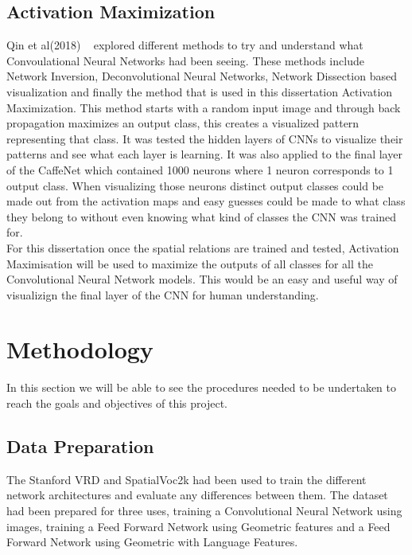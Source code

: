 \documentclass{csfyp}
\begin{document}
\subsection{Activation Maximization}
 Qin et al(2018) ~\cite{AM} explored different methods to try and understand what Convoulational Neural Networks had been seeing. These methods include Network Inversion, Deconvolutional Neural Networks, Network Dissection based visualization and finally the method that is used in this dissertation Activation Maximization. This method starts with a random input image and through back propagation maximizes an output class, this creates a visualized pattern representing that class. It was tested the hidden layers of CNNs to visualize their patterns and see what each layer is learning. It was also applied to the final layer of the CaffeNet which contained 1000 neurons where 1 neuron corresponds to 1 output class. When visualizing those neurons distinct output classes could be made out from the activation maps and easy guesses could be made to what class they belong to without even knowing what kind of classes the CNN was trained for.
\\ 
For this dissertation once the spatial relations are trained and tested, Activation Maximisation will be used to maximize the outputs of all classes for all the Convolutional Neural Network models. This would be an easy and useful way of visualizign the final layer of the CNN for human understanding.


\section{Methodology}
In this section we will be able to see the procedures needed to be undertaken to reach the goals and objectives of this project.

\subsection{Data Preparation}
The Stanford VRD and SpatialVoc2k had been used to train the different network architectures and evaluate any differences between them. The dataset had been prepared for three uses, training a Convolutional Neural Network using images, training a Feed Forward Network using Geometric features and a Feed Forward Network using Geometric with Language Features. 
\end{document}
